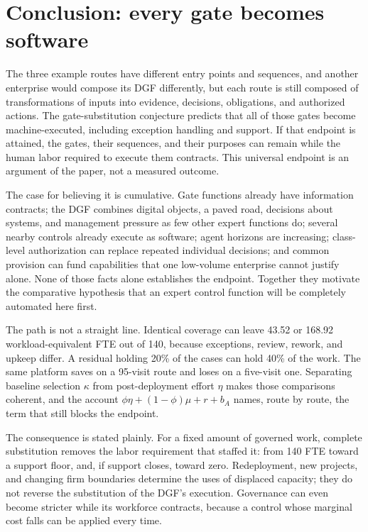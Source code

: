 \section{Conclusion: every gate becomes software}
\label{sec:conclusion}

The three example routes have different entry points and sequences, and another enterprise would
compose its DGF differently, but each route is still composed of transformations of inputs into evidence, decisions, obligations, and
authorized actions. The gate-substitution conjecture predicts that all of those gates become
machine-executed, including exception handling and support. If that endpoint is attained, the
gates, their sequences, and their purposes can remain while the human labor required to execute
them contracts. This universal endpoint is an argument of the paper, not a measured outcome.

The case for believing it is cumulative. Gate functions already have information contracts; the DGF
combines digital objects, a paved road, decisions about systems, and management pressure as few other
expert functions do; several nearby controls already execute as software; agent horizons are
increasing; class-level authorization can replace repeated individual decisions; and common provision
can fund capabilities that one low-volume enterprise cannot justify alone. None of those facts alone
establishes the endpoint. Together they motivate the comparative hypothesis that an expert
control function will be completely automated here first.

The path is not a straight line. Identical coverage can leave 43.52 or 168.92 workload-equivalent FTE
out of 140, because exceptions, review, rework, and upkeep differ. A residual holding 20\% of the cases
can hold 40\% of the work. The same platform saves on a 95-visit route and loses on a five-visit one.
Separating baseline selection $\kappa$ from post-deployment effort $\eta$ makes those comparisons
coherent, and the account $\phi\eta+(1-\phi)\mu+r+b_A$ names, route by route, the term that still
blocks the endpoint.

The consequence is stated plainly. For a fixed amount of governed work, complete substitution removes
the labor requirement that staffed it: from 140 FTE toward a support floor, and, if support closes,
toward zero. Redeployment, new projects, and changing firm boundaries determine the uses of displaced
capacity; they do not reverse the substitution of the DGF's execution. Governance can even become
stricter while its workforce contracts, because a
control whose marginal cost falls can be applied every time.

